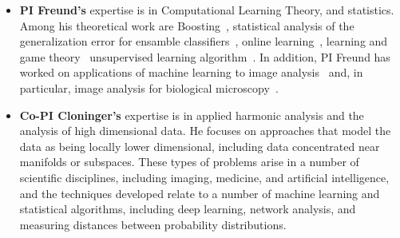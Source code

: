 \documentclass{article}
\begin{document}
\begin{itemize}
\item {\bf PI Freund's} expertise is in Computational Learning Theory,
  and statistics. Among his theoretical work are Boosting~\cite{},
  statistical analysis of the generalization error for ensamble
  classifiers~\cite{}, online learning~\cite{}, learning and game
  theory~\cite{} unsupervised learning algorithm~\cite{}.  In
  addition, PI Freund has worked on applications of machine learning
  to image analysis~{} and, in particular, image analysis for
  biological microscopy~\cite{}.
\item {\bf Co-PI Cloninger's} expertise is in applied harmonic
  analysis and the analysis of high dimensional data.  He focuses on
  approaches that model the data as being locally lower dimensional,
  including data concentrated near manifolds or subspaces.  These
  types of problems arise in a number of scientific disciplines,
  including imaging, medicine, and artificial intelligence, and the
  techniques developed relate to a number of machine learning and
  statistical algorithms, including deep learning, network analysis,
  and measuring distances between probability distributions.


\end{itemize}
\end{document}
